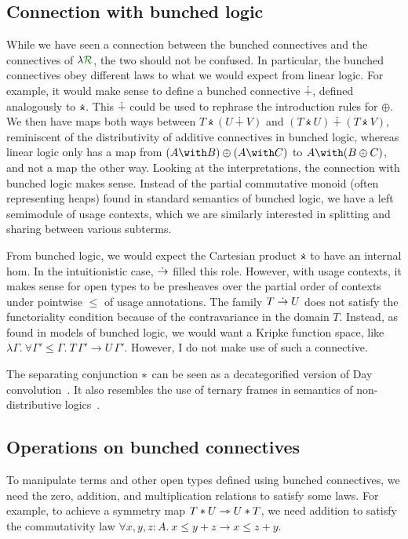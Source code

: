 \subsection{Connection with bunched logic}\label{sec:bunched-logic}
While we have seen a connection between the bunched connectives and the
connectives of $\name$, the two should not be confused.
In particular, the bunched connectives obey different laws to what we would
expect from linear logic.
For example, it would make sense to define a bunched connective $\dotplus$,
defined analogously to $\dottimes$.
This $\dotplus$ could be used to rephrase the introduction rules for $\oplus$.
We then have maps both ways between $T \dottimes (U \dotplus V)$ and
$(T \dottimes U) \dotplus (T \dottimes V)$, reminiscent of the distributivity of
additive connectives in bunched logic,
whereas linear logic only has a map from $(A \with B) \oplus (A \with C)$ to
$A \with (B \oplus C)$, and not a map the other way.
Looking at the interpretations, the connection with bunched logic makes sense.
Instead of the partial commutative monoid (often representing heaps) found in
standard semantics of bunched logic, we have a left semimodule of usage
contexts, which we are similarly interested in splitting and sharing between
various subterms.

From bunched logic, we would expect the Cartesian product $\dottimes$ to have an
internal hom.
In the intuitionistic case, $\mathrel{\dot\to}$ filled this role.
However, with usage contexts, it makes sense for open types to be presheaves
over the partial order of contexts under pointwise $\leq$ of usage annotations.
The family $T \mathrel{\dot\to} U$ does not satisfy the functoriality condition because of
the contravariance in the domain $T$.
Instead, as found in models of bunched logic, we would want a Kripke function
space, like
$\lambda\Gamma.~\forall \Gamma' \leq \Gamma.~T\,\Gamma' \to U\,\Gamma'$.
However, I do not make use of such a connective.

The separating conjunction $\mathbin{*}$ can be seen as a decategorified version of Day
convolution~\citep{Day70}.
It also resembles the use of ternary frames in semantics of non-distributive
logics~\citep[chapter 12]{Restall1999}.

\subsection{Operations on bunched connectives}\label{sec:bunched-op}
To manipulate terms and other open types defined using bunched connectives, we
need the zero, addition, and multiplication relations to satisfy some laws.
For example, to achieve a symmetry map $T \mathbin{*} U \rightarrowtriangle U \mathbin{*} T$,
we need addition to satisfy the commutativity law
$\forall x,y,z : A.~x \leq y + z \to x \leq z + y$.

